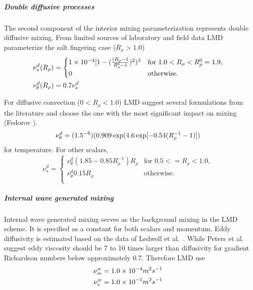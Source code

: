 \subparagraph{Double diffusive processes}
The second component of the interior mixing parameterization represents
double diffusive mixing.  From limited sources of laboratory and field
data LMD parameterize the salt fingering case ($R_{\rho}>1.0$)
\begin{align}
\nu_{s}^{d}(R_{\rho}) & =
	\begin{cases}
      1\times10^{-4}[1-(\frac{(R_{\rho}-1}{R_{\rho}^0-1})^2)^{3}&
      \text{for $1.0<R_{\rho}<R_{\rho}^0=1.9$},\\
           0& \text{otherwise}.
        \end{cases}
\\ \vspace{1mm}
\nu_{\theta}^{d}(R_{\rho}) & =0.7\nu_{s}^{d}
\end{align}

For diffusive convection ($0<R_{\rho}<1.0$) LMD suggest several
formulations from the literature and choose the one with the most
significant impact on mixing (Fedorov \cite{Fedorov88}).
\begin{equation}
\nu_{\theta}^{d}=(1.5 \time 10^{-6})(0.909 \exp(4.6 \exp[-0.54(R_{\rho}^{-1}-1)])
\end{equation}
for temperature.  For other scalars,
\begin{equation}
   \nu_{s}^{d}=
	\begin{cases}
	     \nu_{\theta}^{d}(1.85-0.85R_{\rho}^{-1})R_{\rho}& \text{for $0.5<=R_{\rho}<1.0$},\\ 
             \nu_{\theta}^{d}0.15R_{\rho}&  \text{otherwise}. \\
        \end{cases}
\end{equation}

\subparagraph{Internal wave generated mixing}
Internal wave generated mixing serves as the background mixing in the
LMD scheme.  It is specified as a constant for both scalars and
momentum.  Eddy diffusivity is estimated based on the data of Ledwell
et al.\ \cite{LWL93}.  While Peters et al.\ \cite{Peters88} suggest
eddy viscosity should be 7 to 10 times larger than diffusivity for
gradient Richardson numbers below approximately 0.7.  Therefore LMD use
\begin{align}
\nu_{m}^w & =1.0 \times 10^{-4} m^2 s^{-1}
\\ \vspace{1mm}
\nu_{s}^w & =1.0 \times 10^{-5} m^2 s^{-1}
\end{align}


